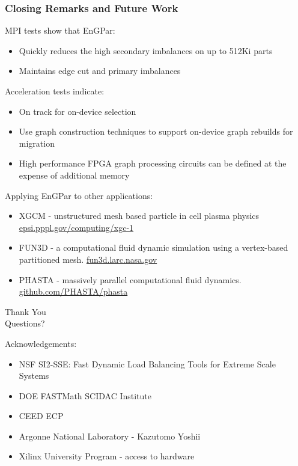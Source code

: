\documentclass{beamer}
\begin{document}
\begin{frame}
  \frametitle{Closing Remarks and Future Work}
  MPI tests show that EnGPar:
  \begin{itemize}
  \item Quickly reduces the high secondary imbalances on up to 512Ki parts
  \item Maintains edge cut and primary imbalances
  \end{itemize}
  Acceleration tests indicate:
  \begin{itemize}
  \item On track for on-device selection
  \item Use graph construction techniques to support on-device graph rebuilds for migration
  \item High performance FPGA graph processing circuits can be defined at the expense of additional memory
  \end{itemize}
  Applying EnGPar to other applications:
  \begin{itemize}
    \item XGCM - unstructured mesh based particle in cell plasma physics \url{epsi.pppl.gov/computing/xgc-1}
    \item FUN3D - a computational fluid dynamic simulation using a vertex-based partitioned mesh. \url{fun3d.larc.nasa.gov}
    \item PHASTA - massively parallel computational fluid dynamics. \url{github.com/PHASTA/phasta}
  \end{itemize}
\end{frame}

\begin{frame}
  \begin{center}
    {\huge
      Thank You\\
      \bigskip
      \bigskip
      \bigskip
      \bigskip
      \bigskip
      \huge
      Questions?\\
      \bigskip
      \bigskip
      \bigskip
    }
  \end{center}
  \large
  Acknowledgements:\\
  \begin{itemize}
    \item NSF SI2-SSE: Fast Dynamic Load Balancing Tools for Extreme Scale Systems
    \item DOE FASTMath SCIDAC Institute
    \item CEED ECP
    \item Argonne National Laboratory - Kazutomo Yoshii
    \item Xilinx University Program - access to hardware
  \end{itemize}
\end{frame}
\end{document}
